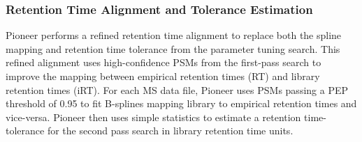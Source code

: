 \documentclass[pdflatex,sn-nature]{sn-jnl}
\begin{document}
\subsubsection{Retention Time Alignment and Tolerance Estimation}\label{subsubsec:rt-alignment-tolerance-estimation}

Pioneer performs a refined retention time alignment to replace both the spline mapping and retention time tolerance from the parameter tuning search. This refined alignment uses high-confidence PSMs from the first-pass search to improve the mapping between empirical retention times (RT) and library retention times (iRT). For each MS data file, Pioneer uses PSMs passing a PEP threshold of 0.95 to fit B-splines mapping library to empirical retention times and vice-versa. Pioneer then uses simple statistics to estimate a retention time-tolerance for the second pass search in library retention time units. 
\end{document}
